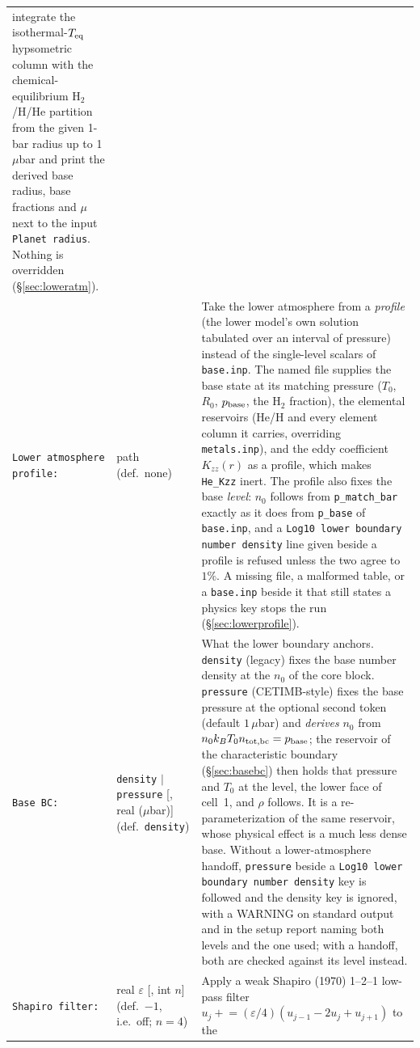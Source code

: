 \documentclass[english,a4paper]{my_memo}
\begin{document}
\begin{longtable}{@{}p{}p{}p{}@{}}
  integrate the isothermal-$T_{\rm eq}$ hypsometric column with the
  chemical-equilibrium H$_2$/H/He partition from the given 1-bar radius up to
  1\,$\mu$bar and print the derived base radius, base fractions and $\mu$ next
  to the input \texttt{Planet radius}. Nothing is overridden
  (\S\ref{sec:loweratm}). \\
\texttt{Lower atmosphere profile:} & path (def.\ none) & Take the lower
  atmosphere from a \emph{profile} (the lower model's own solution tabulated
  over an interval of pressure) instead of the single-level scalars of
  \texttt{base.inp}. The named file supplies the base state at its matching
  pressure ($T_0$, $R_0$, $p_{\rm base}$, the H$_2$ fraction), the elemental
  reservoirs (He/H and every element column it carries, overriding
  \texttt{metals.inp}), and the eddy coefficient $K_{zz}(r)$ as a profile,
  which makes \texttt{He\_Kzz} inert. The profile also fixes the base
  \emph{level}: $n_0$ follows from \texttt{p\_match\_bar} exactly as it does
  from \texttt{p\_base} of \texttt{base.inp}, and a
  \texttt{Log10 lower boundary number density} line given beside a profile is
  refused unless the two agree to $1\%$. A missing file, a malformed table, or
  a \texttt{base.inp} beside it that still states a physics key stops the run
  (\S\ref{sec:lowerprofile}). \\
\texttt{Base BC:} & \texttt{density} $|$ \texttt{pressure} [, real ($\mu$bar)]
  (def.\ \texttt{density}) & What the lower boundary anchors.
  \texttt{density} (legacy) fixes the base number density at the $n_0$ of the
  core block. \texttt{pressure} (CETIMB-style) fixes the base pressure at the
  optional second token (default $1\,\mu$bar) and \emph{derives}
  $n_0$ from $n_0k_BT_0n_{\rm tot,bc}=p_{\rm base}$; the reservoir of the
  characteristic boundary (\S\ref{sec:basebc}) then holds that pressure and
  $T_0$ at the level, the lower face of cell~1, and $\rho$ follows. It is a
  re-parameterization of the same reservoir, whose physical effect is a much
  less dense base. Without a lower-atmosphere handoff, \texttt{pressure}
  beside a \texttt{Log10 lower boundary number density} key is followed and
  the density key is ignored, with a WARNING on standard output and in the
  setup report naming both levels and the one used; with a handoff, both are
  checked against its level instead. \\
\texttt{Shapiro filter:} & real $\varepsilon$ [, int $n$]
  (def.\ $-1$, i.e.\ off; $n=4$) & Apply a weak Shapiro (1970) 1--2--1 low-pass
  filter $u_j \mathrel{+}= (\varepsilon/4)(u_{j-1}-2u_j+u_{j+1})$ to the

\end{longtable}
\end{document}

